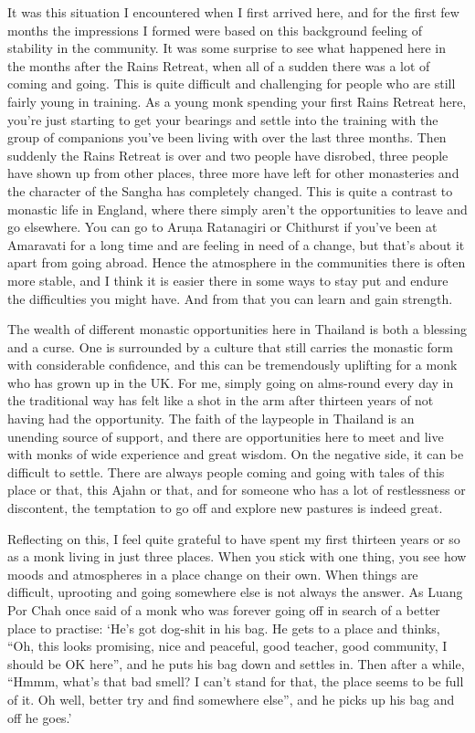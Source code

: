 It was this situation I encountered when I first arrived here, and for
the first few months the impressions I formed were based on this
background feeling of stability in the community. It was some surprise
to see what happened here in the months after the Rains Retreat, when
all of a sudden there was a lot of coming and going. This is quite
difficult and challenging for people who are still fairly young in
training. As a young monk spending your first Rains Retreat here, you're
just starting to get your bearings and settle into the training with the
group of companions you've been living with over the last three months. 
Then suddenly the Rains Retreat is over and two people have disrobed, 
three people have shown up from other places, three more have left for
other monasteries and the character of the Sangha has completely
changed. This is quite a contrast to monastic life in England, where
there simply aren't the opportunities to leave and go elsewhere. You can
go to Aruṇa Ratanagiri or Chithurst if you've been at Amaravati for a
long time and are feeling in need of a change, but that's about it apart
from going abroad. Hence the atmosphere in the communities there is
often more stable, and I think it is easier there in some ways to stay
put and endure the difficulties you might have. And from that you can
learn and gain strength. 

The wealth of different monastic opportunities here in Thailand is both
a blessing and a curse. One is surrounded by a culture that still
carries the monastic form with considerable confidence, and this can be
tremendously uplifting for a monk who has grown up in the UK. For me, 
simply going on alms-round every day in the traditional way has felt like
a shot in the arm after thirteen years of not having had the
opportunity. The faith of the laypeople in Thailand is an unending
source of support, and there are opportunities here to meet and live
with monks of wide experience and great wisdom. On the negative side, it
can be difficult to settle. There are always people coming and going
with tales of this place or that, this Ajahn or that, and for someone
who has a lot of restlessness or discontent, the temptation to go off
and explore new pastures is indeed great. 

Reflecting on this, I feel quite grateful to have spent my first
thirteen years or so as a monk living in just three places. When you
stick with one thing, you see how moods and atmospheres in a place
change on their own. When things are difficult, uprooting and going
somewhere else is not always the answer. As Luang Por Chah once said of
a monk who was forever going off in search of a better place to
practise: `He's got dog-shit in his bag. He gets to a place and thinks, 
``Oh, this looks promising, nice and peaceful, good teacher, good
community, I should be OK here'', and he puts his bag down and settles
in. Then after a while, ``Hmmm, what's that bad smell? I can't stand for
that, the place seems to be full of it. Oh well, better try and find
somewhere else'', and he picks up his bag and off he goes.'

